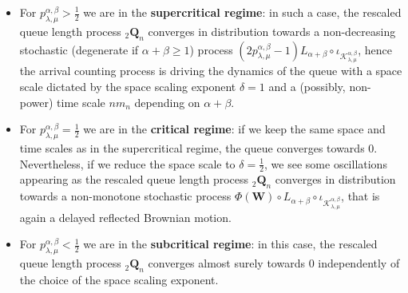 \documentclass[]{amsart}
\numberwithin{equation}{section}
\theoremstyle{remark}
\theoremstyle{definition}
\begin{document}
\begin{itemize}
	\item For $p_{\lambda,\mu}^{\alpha,\beta}>\frac{1}{2}$ we are in the \textbf{supercritical regime}: in such a case, the rescaled queue length process ${}_2{\mathbf{Q}}_n$ converges in distribution towards a non-decreasing stochastic (degenerate if $\alpha+\beta \ge 1$) process $(2p_{\lambda,\mu}^{\alpha,\beta}-1)L_{\alpha+\beta} \circ \iota_{\mathcal{K}_{\lambda,\mu}^{\alpha,\beta}}$, hence the arrival counting process is driving the dynamics of the queue with a space scale dictated by the space scaling exponent $\delta=1$ and a (possibly, non-power) time scale $nm_n$ depending on $\alpha+\beta$. 
	\item For $p_{\lambda,\mu}^{\alpha,\beta}=\frac{1}{2}$ we are in the \textbf{critical regime}: if we keep the same space and time scales as in the supercritical regime, the queue converges towards $0$. Nevertheless, if we reduce the space scale to $\delta=\frac{1}{2}$, we see some oscillations appearing as the rescaled queue length process ${}_2{\mathbf{Q}}_n$ converges in distribution towards a non-monotone stochastic process $\Phi(\mathbf{W})\circ L_{\alpha+\beta}\circ \iota_{\mathcal{K}_{\lambda,\mu}^{\alpha,\beta}}$, that is again a delayed reflected Brownian motion. 
	\item For $p_{\lambda,\mu}^{\alpha,\beta}<\frac{1}{2}$ we are in the \textbf{subcritical regime}: in this case, the rescaled queue length process ${}_2\mathbf{Q}_n$ converges almost surely towards $0$ independently of the choice of the space scaling exponent.
\end{itemize}
\end{document}
